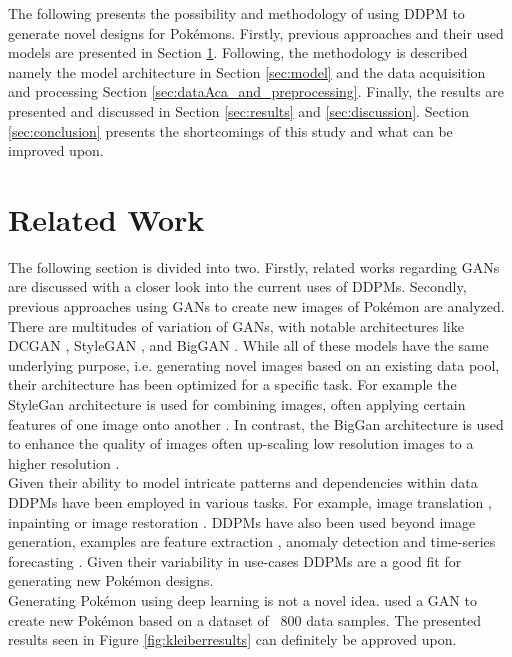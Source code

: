 \documentclass[12pt]{article}
\theoremstyle{plain}
\theoremstyle{definition}
\theoremstyle{remark}
\begin{document}
The following presents the possibility and methodology of using \ac{DDPM} to generate novel designs for Pokémons. Firstly, previous approaches and their used models are presented in Section \ref{sec:relwork}. Following, the methodology is described namely the model architecture in Section \ref{sec:model} and the data acquisition and processing Section \ref{sec:dataAca_and_preprocessing}. Finally, the results are presented and discussed in Section \ref{sec:results} and \ref{sec:discussion}. Section \ref{sec:conclusion} presents the shortcomings of this study and what can be improved upon. 
%
%
\section{Related Work}
\label{sec:relwork}
The following section is divided into two. Firstly, related works regarding \ac{GAN}s are discussed with a closer look into the current uses of \ac{DDPM}s. Secondly, previous approaches using \ac{GAN}s to create new images of Pokémon are analyzed. 
There are multitudes of variation of \ac{GAN}s, with notable architectures like \ac{DCGAN} \citep{Radford2016}, StyleGAN \citep{Karras2019}, and BigGAN \citep{Brock2019}. While all of these models have the same underlying purpose, i.e. generating novel images based on an existing data pool, their architecture has been optimized for a specific task. For example the StyleGan architecture is used for combining images, often applying certain features of one image onto another \citep{Karras2019}. In contrast, the BigGan architecture is used to enhance the quality of images often up-scaling low resolution images to a higher resolution \citep{Brock2019}. \\
Given their ability to model intricate patterns and dependencies within data \ac{DDPM}s have been employed in various tasks. For example, image translation \citep{Sasaki2021}, inpainting \citep{Lugmayr2022} or image restoration \citep{Nair2023}. \ac{DDPM}s have also been used beyond image generation, examples are feature extraction \citep{Bandara2024}, anomaly detection \citep{Wyatt2022} and time-series forecasting \citep{Rasul2021}. Given their variability in use-cases \ac{DDPM}s are a good fit for generating new Pokémon designs. \\


Generating Pokémon using deep learning is not a novel idea. \cite{Kleiber2020} used a \ac{GAN} to create new Pokémon based on a dataset of ~800 data samples. The presented results seen in Figure \ref{fig:kleiberresults} can definitely be approved upon.\\
 
\end{document}
